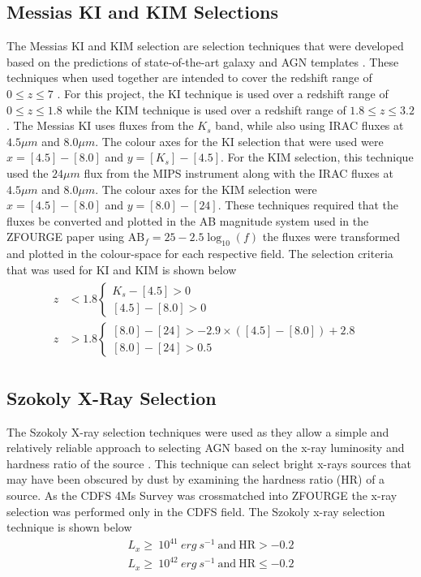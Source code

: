 \documentclass[11pt]{iopart}
\begin{document}
\subsection{Messias KI and KIM Selections}
The Messias KI and KIM selection are selection techniques that were developed based on the predictions of state-of-the-art galaxy and AGN templates \cite{messias_new_2012}. These techniques when used together are intended to cover the redshift range of $0 \leq z \leq 7$ \cite{messias_new_2012}. For this project, the KI technique is used over a redshift range of $0 \leq z \leq 1.8$ while the KIM technique is used over a redshift range of $1.8 \leq z \leq 3.2$. The Messias KI uses fluxes from the $K_s$ band, while also using IRAC fluxes at $4.5\mu m$ and $8.0\mu m$. The colour axes for the KI selection that were used were $x = [4.5] - [8.0]$ and $y = [K_s] - [4.5]$. For the KIM selection, this technique used the $24\mu m$ flux from the MIPS instrument along with the IRAC fluxes at $4.5\mu m$ and $8.0\mu m$. The colour axes for the KIM selection were $x = [4.5] - [8.0]$ and $y = [8.0] - [24]$. These techniques required that the fluxes be converted and plotted in the AB magnitude system used in the ZFOURGE paper \cite{straatman_fourstar_2016} using $\text{AB}_f =25-2.5\log_{10} \left( f \right)$ the fluxes were transformed and plotted in the colour-space for each respective field. The selection criteria that was used for KI and KIM is shown below
\begin{align*}
    \begin{split}
        z&<1.8\begin{cases}K_{s}-[4.5]>0&\\ [4.5]-[8.0]>0&\end{cases} \\
        z&>1.8\begin{cases}[8.0]-[24]>-2.9\times ([4.5]-[8.0])+2.8&\\ [8.0]-[24]>0.5&\end{cases}
    \end{split}
\end{align*}
\subsection{Szokoly X-Ray Selection}
The Szokoly X-ray selection techniques were used as they allow a simple and relatively reliable approach to selecting AGN based on the x-ray luminosity and hardness ratio of the source \cite{szokoly_chandra_2004}. This technique can select bright x-rays sources that may have been obscured by dust by examining the hardness ratio (HR) of a source. As the CDFS 4Ms Survey was crossmatched into ZFOURGE the x-ray selection was performed only in the CDFS field. The Szokoly x-ray selection technique is shown below
\begin{align*}
    L_x \geq \ 10^{41}\ erg\ s^{-1}\ \text{and}\ \text{HR} > -0.2 \\
    L_x \geq \ 10^{42}\ erg\ s^{-1}\ \text{and}\  \text{HR} \leq -0.2
\end{align*}
\end{document}
